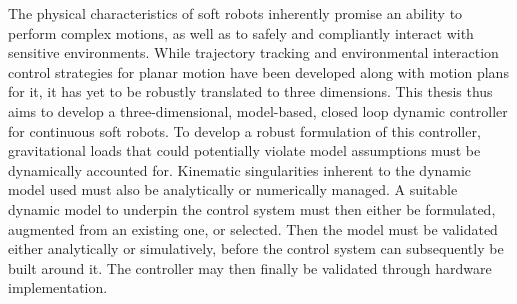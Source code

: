 
The physical characteristics of soft robots inherently promise an ability to perform complex motions, as well as to safely and compliantly interact with sensitive environments. 
While trajectory tracking and environmental interaction control strategies for planar motion have been developed along with motion plans for it, it has yet to be robustly translated to three dimensions. 
This thesis thus aims to develop a three-dimensional, model-based, closed loop dynamic controller for continuous soft robots.
To develop a robust formulation of this controller, gravitational loads that could potentially violate model assumptions must be dynamically accounted for. Kinematic singularities inherent to the dynamic model used must also be analytically or numerically managed.
A suitable dynamic model to underpin the control system must then either be formulated, augmented from an existing one, or selected. Then the model must be validated either analytically or simulatively, before the control system can subsequently be built around it. The controller may then finally be validated through hardware implementation.  

